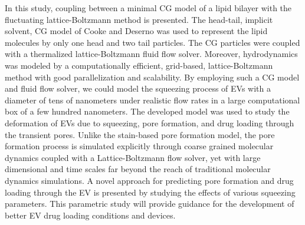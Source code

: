In this study, coupling between a minimal CG model of a lipid bilayer with the fluctuating lattice-Boltzmann method is presented. The head-tail, implicit solvent, CG model of Cooke and Deserno\cite{a33} was used to represent the lipid molecules by only one head and two tail particles. The CG particles were coupled with a thermalized lattice-Boltzmann fluid flow solver. Moreover, hydrodynamics was modeled by a computationally efficient, grid-based, lattice-Boltzmann method with good parallelization and scalability. By employing such a CG model and fluid flow solver, we could model the squeezing process of EVs with a diameter of tens of nanometers under realistic flow rates in a large computational box of a few hundred nanometers. The developed model was used to study the deformation of EVs due to squeezing, pore formation, and drug loading through the transient pores. Unlike the stain-based pore formation model\cite{a52}, the pore formation process is simulated explicitly through coarse grained molecular dynamics coupled with a Lattice-Boltzmann flow solver, yet with large dimensional and time scales far beyond the reach of traditional molecular dynamics simulations. A novel approach for predicting pore formation and drug loading through the EV  is presented by studying the effects of various squeezing parameters.  This parametric study will provide guidance for the development of better EV drug loading conditions and devices.
